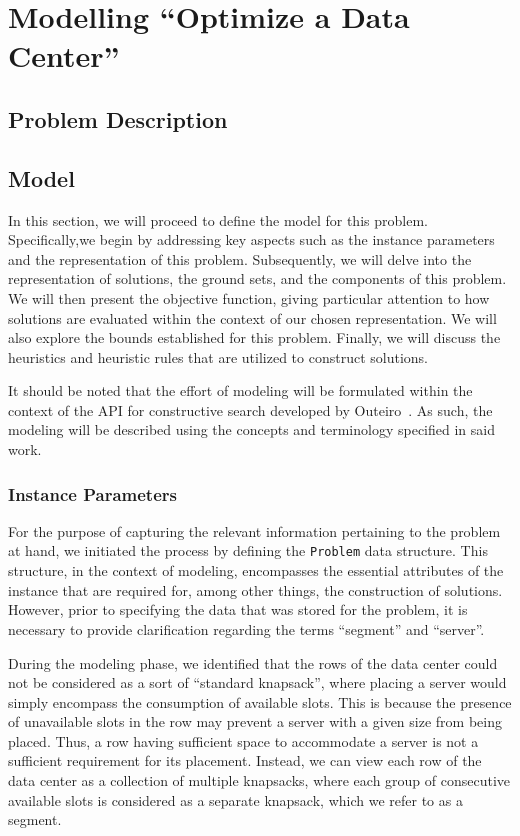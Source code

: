 \section{Modelling ``Optimize a Data Center''} \label{section:data-center}


\subsection{Problem Description} \label{section:data-center-problem}


\subsection{Model} \label{section:data-center-model}

In this section, we will proceed to define the model for this problem.
Specifically,we begin by addressing key aspects such as the instance parameters
and the representation of this problem. Subsequently, we will delve into the
representation of solutions, the ground sets, and the components of this problem.
We will then present the objective function, giving particular attention to how
solutions are evaluated within the context of our chosen representation. We will
also explore the bounds established for this problem. Finally, we will discuss
the heuristics and heuristic rules that are utilized to construct solutions.

It should be noted that the effort of modeling will be formulated within the
context of the API for constructive search developed by
Outeiro~\cite{outeiro2021application}. As such, the modeling will be described
using the concepts and terminology specified in said work.

\subsubsection{Instance Parameters} \label{section:data-center-representation}

For the purpose of capturing the relevant information pertaining to the problem
at hand, we initiated the process by defining the \texttt{Problem} data
structure. This structure, in the context of modeling, encompasses the essential
attributes of the instance that are required for, among other things, the
construction of solutions. However, prior to specifying the data that was stored
for the problem, it is necessary to provide clarification regarding the terms
``segment'' and ``server''.

During the modeling phase, we identified that the rows of the data center could
not be considered as a sort of ``standard knapsack'', where placing a server
would simply encompass the consumption of available slots. This is because the
presence of unavailable slots in the row may prevent a server with a given size
from being placed. Thus, a row having sufficient space to accommodate a server
is not a sufficient requirement for its placement. Instead, we can view each row
of the data center as a collection of multiple knapsacks, where each group of
consecutive available slots is considered as a separate knapsack, which we refer
to as a segment.

